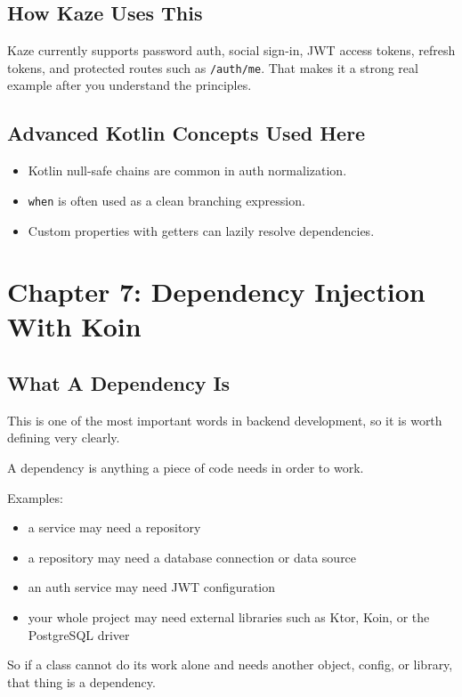 \documentclass[11pt,a4paper]{article}
\begin{document}
\subsection{How Kaze Uses This}

Kaze currently supports password auth, social sign-in, JWT access tokens, refresh tokens, and protected routes such as \texttt{/auth/me}. That makes it a strong real example after you understand the principles.

\subsection{Advanced Kotlin Concepts Used Here}

\begin{itemize}
    \item Kotlin null-safe chains are common in auth normalization.
    \item \texttt{when} is often used as a clean branching expression.
    \item Custom properties with getters can lazily resolve dependencies.
\end{itemize}

\section{Chapter 7: Dependency Injection With Koin}

\subsection{What A Dependency Is}

This is one of the most important words in backend development, so it is worth defining very clearly.

A dependency is anything a piece of code needs in order to work.

Examples:
\begin{itemize}
    \item a service may need a repository
    \item a repository may need a database connection or data source
    \item an auth service may need JWT configuration
    \item your whole project may need external libraries such as Ktor, Koin, or the PostgreSQL driver
\end{itemize}

So if a class cannot do its work alone and needs another object, config, or library, that thing is a dependency.
\end{document}
